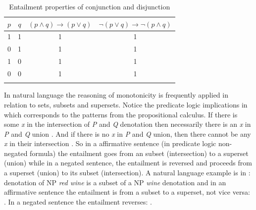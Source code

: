 \documentclass[output=paper,
]{langscibook}
\begin{document}
\ea \label{ex-10} 
\z
\z

\begin{table}
\begin{tabularx}{0.65\textwidth}{cccc}
\lsptoprule
$p$\strut & $q$\strut & $(p\wedge q)\rightarrow(p\vee q)$\strut & $\neg (p\vee q)\rightarrow\neg(p\wedge q)$\strut
\tabularnewline
\midrule
1\strut & 1\strut & 1\strut & 1\strut \tabularnewline
0\strut & 1\strut & 1\strut & 1\strut \tabularnewline
1\strut & 0\strut & 1\strut & 1\strut \tabularnewline
0\strut & 0\strut & 1\strut & 1\strut \tabularnewline
\lspbottomrule

\end{tabularx}
\caption{Entailment properties of conjunction and disjunction}
     \label{table1}
\end{table}



\noindent In natural language the reasoning of monotonicity is frequently applied in relation to sets, subsets and supersets. Notice the predicate logic implications in  which corresponds to the patterns from the propositional calculus. If there is some \textit{x} in the intersection of \textit{P} and \textit{Q} denotation then necessarily there is an \textit{x} in \textit{P} and \textit{Q} union . And if there is no \textit{x} in \textit{P} and \textit{Q} union, then there cannot be any \textit{x} in their intersection . So in a affirmative sentence (in predicate logic non-negated formula) the entailment goes from an subset (intersection) to a superset (union) while in a negated sentence, the entailment is reversed and proceeds from a superset (union) to its subset (intersection). A natural language example is in : denotation of NP \textit{red wine} is a subset of a NP \textit{wine} denotation and in an affirmative sentence  the entailment is from a subset to a superset, not vice versa: . In a negated sentence the entailment reverses: .
\end{document}

